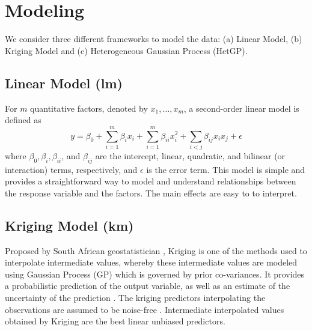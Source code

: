 \documentclass [PhD] {package/uclathes}
\begin{document}
\section{Modeling}\label{sec:models}
We consider three different frameworks to model the data: (a) Linear Model, (b) Kriging Model and (c) Heterogeneous Gaussian Process (HetGP).

\subsection*{{Linear Model (lm)}}

For $m$ quantitative factors, denoted by $x_1, \ldots, x_m$, a second-order linear model is defined as
\begin{equation}
y=\beta_0+\sum_{i=1}^m \beta_i x_i+\sum_{i=1}^m \beta_{i i} x_i^2+\sum_{i<j} \beta_{i j} x_i x_j+\epsilon
\end{equation}
where $\beta_0, \beta_i, \beta_{i i}$, and $\beta_{i j}$ are the intercept, linear, quadratic, and bilinear (or interaction) terms, respectively, and $\epsilon$ is the error term. This model is simple and provides a straightforward way to model and understand relationships between the response variable and the factors. The main effects are easy to to interpret.  %

\subsection*{Kriging Model (km)}
Proposed by South African geostatistician \textcite{krige1951statistical}, Kriging is one of the methods used to interpolate intermediate values, whereby these intermediate values are modeled using Gaussian Process (GP) which is governed by prior co-variances. It provides a probabilistic prediction of the output variable, as well as an estimate of the uncertainty of the prediction \parencite{chevalier2014kriginv}. The kriging predictors interpolating the observations are assumed to be noise-free \parencite{roustant2012dicekriging}. Intermediate interpolated values obtained by Kriging are the best linear unbiased predictors. %
\end{document}
